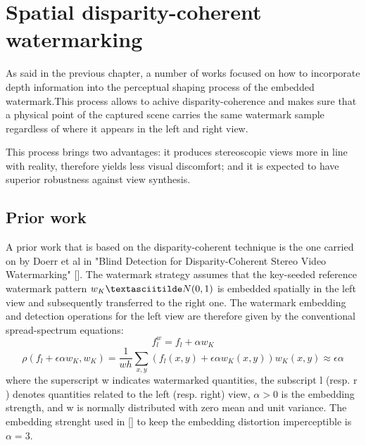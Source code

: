 \chapter{Spatial disparity-coherent watermarking}
\label{spa}



As said in the previous chapter, a number of works focused on how to incorporate depth information into the perceptual shaping process of the embedded watermark.\newline This process allows to achive disparity-coherence and makes sure that a physical point of the captured scene carries the same watermark sample regardless of where it appears in the left and right view.\newline

This process brings two advantages: it produces stereoscopic views more in line with reality, therefore yields less visual discomfort; and it is expected to have superior robustness against view synthesis.\newline

\section{Prior work} 

A prior work that is based on the disparity-coherent technique is the one carried on by Doerr et al in "Blind Detection for Disparity-Coherent
Stereo Video Watermarking" [].\newline
The watermark strategy  assumes that the key-seeded reference watermark pattern $w_{K}\textasciitilde N(0, 1)$ is embedded spatially in the left view and subsequently transferred to the right one.\newline
The watermark embedding and detection operations for the left view are therefore given by the conventional spread-spectrum equations:\newline
$$f_{l}^{w} = f_{l}+\alpha w_{K}$$
$$\rho(f_{l}+\epsilon\alpha w_{K},w_{K})= \frac{1}{wh}\sum_{x,y}(f_{l}(x,y)+\epsilon\alpha w_{K}(x,y))w_{K}(x,y)\approx\epsilon\alpha $$
where the superscript w indicates watermarked quantities, the subscript l (resp. r ) denotes quantities related to the left (resp. right) view, $\alpha > 0$ is the embedding strength, and w is normally distributed with zero mean and unit variance.\newline
The embedding strenght used in [] to keep the embedding distortion imperceptible is $\alpha = 3$.\newline 

